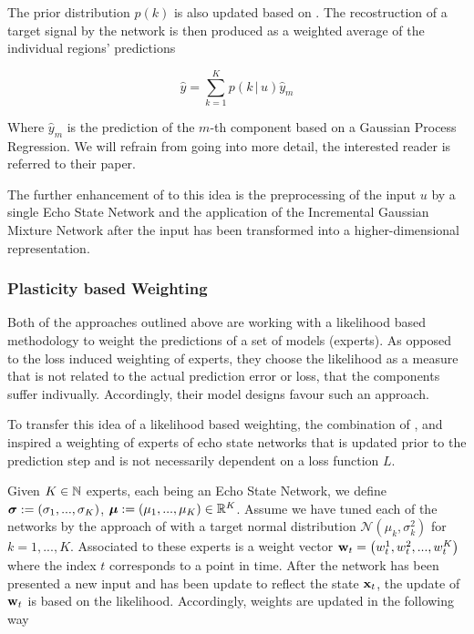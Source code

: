 The prior distribution $p(k)$ is also updated based on . The recostruction of a target signal by the network is then produced as a weighted average of the individual regions' predictions 

\begin{equation}
    \hat y = \sum_{k=1}^{K} p(k \, | \, u) \hat y_m
\end{equation}

Where $\hat y_m$ is the prediction of the $m$-th component based on a Gaussian Process Regression. We will refrain from going into more detail, the interested reader is referred to their paper.

The further enhancement of \cite{ESIGM2011} to this idea is the preprocessing of the input $u$ by a single Echo State Network and the application of the Incremental Gaussian Mixture Network after the input has been transformed into a higher-dimensional representation.


\subsubsection{Plasticity based Weighting}
\label{CH:ExpertModels:Plasticity}

Both of the approaches outlined above are working with a likelihood based methodology to weight the predictions of a set of models (experts). As opposed to the loss induced weighting of experts, they choose the likelihood as a measure that is not related to the actual prediction error or loss, that the components suffer indivually. Accordingly, their model designs favour such an approach. 

To transfer this idea of a likelihood based weighting, the combination of \cite{Schrauwen2008}, \cite{Kalliovirta2015GMUnivariateSeries} and \cite{ESIGM2011} inspired a weighting of experts of echo state networks that is updated prior to the prediction step and is not necessarily dependent on a loss function $L$.

Given $K \in \mathbb{N}$ experts, each being an Echo State Network, we define ${{\bm \sigma}} := \left(\sigma_1, ..., \sigma_K\right)$, ${{\bm \mu}} := \left(\mu_1, ..., \mu_K\right) \in \mathbb{R}^{K}$. Assume we have tuned each of the networks by the approach of \cite{Schrauwen2008} with a target normal distribution $\mathcal{N}(\mu_k, \sigma_k^2)$ for $k = 1, ..., K$. Associated to these experts is a weight vector ${\bf w}_t = \left(w_t^{1}, w_t^{2}, ..., w_t^K\right)$ where the index $t$ corresponds to a point in time.
After the network has been presented a new input and has been update to reflect the state ${\bf x}_t$, the update of ${\bf w}_t$ is based on the likelihood. Accordingly, weights are updated in the following way

